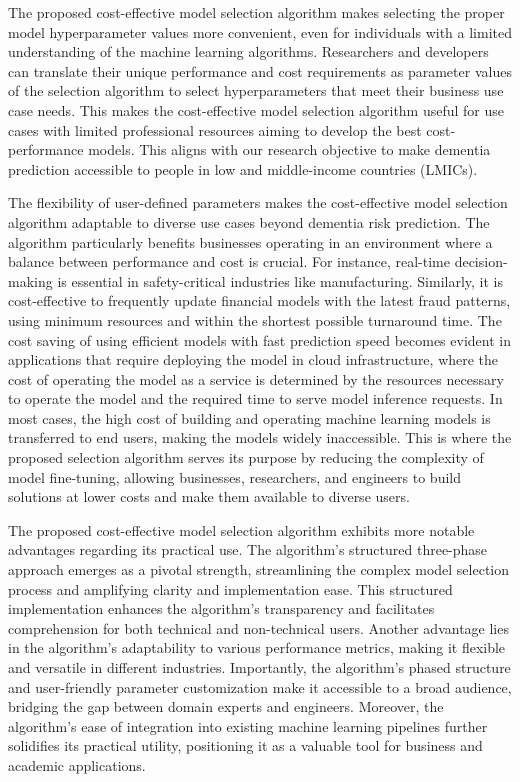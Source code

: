 The proposed cost-effective model selection algorithm makes selecting the proper model hyperparameter values more convenient, even for individuals with a limited understanding of the machine learning algorithms. Researchers and developers can translate their unique performance and cost requirements as parameter values of the selection algorithm to select hyperparameters that meet their business use case needs. This makes the cost-effective model selection algorithm useful for use cases with limited professional resources aiming to develop the best cost-performance models. This aligns with our research objective to make dementia prediction accessible to people in low and middle-income countries (LMICs).

The flexibility of user-defined parameters makes the cost-effective model selection algorithm adaptable to diverse use cases beyond dementia risk prediction. The algorithm particularly benefits businesses operating in an environment where a balance between performance and cost is crucial. For instance, real-time decision-making is essential in safety-critical industries like manufacturing. Similarly, it is cost-effective to frequently update financial models with the latest fraud patterns, using minimum resources and within the shortest possible turnaround time. The cost saving of using efficient models with fast prediction speed becomes evident in applications that require deploying the model in cloud infrastructure, where the cost of operating the model as a service is determined by the resources necessary to operate the model and the required time to serve model inference requests. In most cases, the high cost of building and operating machine learning models is transferred to end users, making the models widely inaccessible. This is where the proposed selection algorithm serves its purpose by reducing the complexity of model fine-tuning, allowing businesses, researchers, and engineers to build solutions at lower costs and make them available to diverse users.

The proposed cost-effective model selection algorithm exhibits more notable advantages regarding its practical use. The algorithm's structured three-phase approach emerges as a pivotal strength, streamlining the complex model selection process and amplifying clarity and implementation ease. This structured implementation enhances the algorithm's transparency and facilitates comprehension for both technical and non-technical users. Another advantage lies in the algorithm's adaptability to various performance metrics, making it flexible and versatile in different industries. Importantly, the algorithm's phased structure and user-friendly parameter customization make it accessible to a broad audience, bridging the gap between domain experts and engineers. Moreover, the algorithm's ease of integration into existing machine learning pipelines further solidifies its practical utility, positioning it as a valuable tool for business and academic applications.

